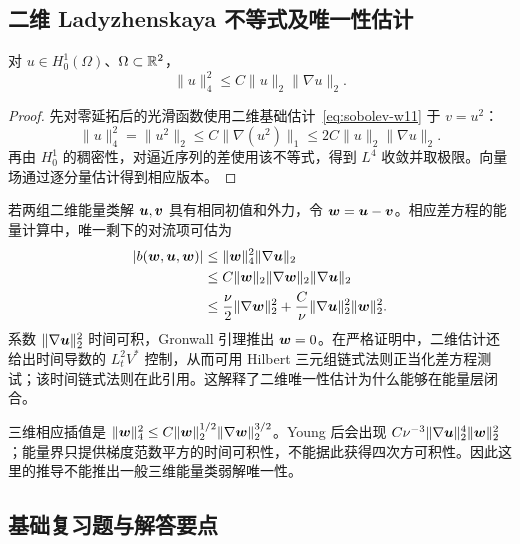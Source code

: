 \subsection{二维 Ladyzhenskaya 不等式及唯一性估计}

\begin{proposition}[二维四次方估计]\label{prop:sobolev-lady}
对 $u\in H^1_0(\Omega)$、$\Omega\subset\mathbb R^2$，
\begin{equation}
 \|u\|_4^2\le C\|u\|_2\|\nabla u\|_2.
 \label{eq:sobolev-lady}
\end{equation}
\end{proposition}
\begin{proof}
先对零延拓后的光滑函数使用二维基础估计~\eqref{eq:sobolev-w11} 于 $v=u^2$：
\[
 \|u\|_4^2=\|u^2\|_2
 \le C\|\nabla(u^2)\|_1
 \le2C\|u\|_2\|\nabla u\|_2.
\]
再由 $H^1_0$ 的稠密性，对逼近序列的差使用该不等式，得到 $L^4$ 收敛并取极限。向量场通过逐分量估计得到相应版本。
\end{proof}

若两组二维能量类解 $\bm{u},\bm{v}$ 具有相同初值和外力，令 $\bm{w}=\bm{u}-\bm{v}$。相应差方程的能量计算中，唯一剩下的对流项可估为
\begin{align*}
 |b(\bm{w},\bm{u},\bm{w})|
 &\le\|\bm{w}\|_4^2\|\nabla\bm{u}\|_2\\
 &\le C\|\bm{w}\|_2\|\nabla\bm{w}\|_2\|\nabla\bm{u}\|_2\\
 &\le\frac\nu2\|\nabla\bm{w}\|_2^2
       +\frac C\nu\|\nabla\bm{u}\|_2^2\|\bm{w}\|_2^2.
\end{align*}
系数 $\|\nabla\bm{u}\|_2^2$ 时间可积，Gronwall 引理推出 $\bm{w}=0$。在严格证明中，二维估计还给出时间导数的 $L^2_tV^*$ 控制，从而可用 Hilbert 三元组链式法则正当化差方程测试；该时间链式法则在此引用。这解释了二维唯一性估计为什么能够在能量层闭合。

三维相应插值是 $\|\bm{w}\|_4^2\le C\|\bm{w}\|_2^{1/2}\|\nabla\bm{w}\|_2^{3/2}$。Young 后会出现 $C\nu^{-3}\|\nabla\bm{u}\|_2^4\|\bm{w}\|_2^2$；能量界只提供梯度范数平方的时间可积性，不能据此获得四次方可积性。因此这里的推导不能推出一般三维能量类弱解唯一性。



\subsection{基础复习题与解答要点}


